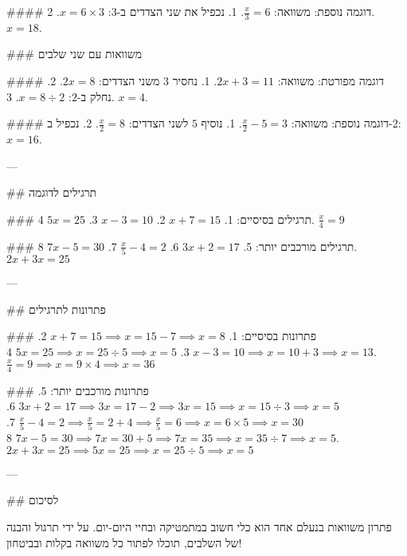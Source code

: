 #### דוגמה נוספת:
משוואה: $\frac{x}{3} = 6$.
1. נכפיל את שני הצדדים ב-$3$: $x = 6 \times 3$.
2. $x = 18$.

### משוואות עם שני שלבים

#### דוגמה מפורטת:
משוואה: $2x + 3 = 11$.
1. נחסיר $3$ משני הצדדים: $2x = 8$.
2. נחלק ב-$2$: $x = 8 \div 2$.
3. $x = 4$.

#### דוגמה נוספת:
משוואה: $\frac{x}{2} - 5 = 3$.
1. נוסיף $5$ לשני הצדדים: $\frac{x}{2} = 8$.
2. נכפיל ב-$2$: $x = 16$.

---

## תרגילים לדוגמה

### תרגילים בסיסיים:
1. $x + 7 = 15$
2. $x - 3 = 10$
3. $5x = 25$
4. $\frac{x}{4} = 9$

### תרגילים מורכבים יותר:
5. $3x + 2 = 17$
6. $\frac{x}{5} - 4 = 2$
7. $7x - 5 = 30$
8. $2x + 3x = 25$

---

## פתרונות לתרגילים

### פתרונות בסיסיים:
1. $x + 7 = 15 \implies x = 15 - 7 \implies x = 8$
2. $x - 3 = 10 \implies x = 10 + 3 \implies x = 13$
3. $5x = 25 \implies x = 25 \div 5 \implies x = 5$
4. $\frac{x}{4} = 9 \implies x = 9 \times 4 \implies x = 36$

### פתרונות מורכבים יותר:
5. $3x + 2 = 17 \implies 3x = 17 - 2 \implies 3x = 15 \implies x = 15 \div 3 \implies x = 5$
6. $\frac{x}{5} - 4 = 2 \implies \frac{x}{5} = 2 + 4 \implies \frac{x}{5} = 6 \implies x = 6 \times 5 \implies x = 30$
7. $7x - 5 = 30 \implies 7x = 30 + 5 \implies 7x = 35 \implies x = 35 \div 7 \implies x = 5$
8. $2x + 3x = 25 \implies 5x = 25 \implies x = 25 \div 5 \implies x = 5$

---

## לסיכום

פתרון משוואות בנעלם אחד הוא כלי חשוב במתמטיקה ובחיי היום-יום. על ידי תרגול והבנה של השלבים, תוכלו לפתור כל משוואה בקלות ובביטחון!
